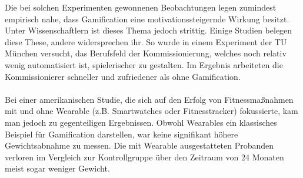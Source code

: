 Die bei solchen Experimenten gewonnenen Beobachtungen legen zumindest empirisch nahe, dass Gamification eine motivationssteigernde Wirkung besitzt. Unter Wissenschaftlern ist dieses Thema jedoch strittig. Einige Studien belegen diese These, andere widersprechen ihr. So wurde in einem Experiment der TU München versucht, das Berufsfeld der Kommissionierung, welches noch relativ wenig automatisiert ist, spielerischer zu gestalten. Im Ergebnis arbeiteten die Kommissionierer schneller und zufriedener als ohne Gamification. \cite{Src:WwieWissen} \\ \\
Bei einer amerikanischen Studie, die sich auf den Erfolg von Fitnessmaßnahmen mit und ohne Wearable (z.B. Smartwatches oder Fitnesstracker) fokussierte, kam man jedoch zu gegenteiligen Ergebnissen. Obwohl Wearables ein klassisches Beispiel für Gamification darstellen, war keine signifikant höhere Gewichtsabnahme zu messen. Die mit Wearable ausgestatteten Probanden verloren im Vergleich zur Kontrollgruppe über den Zeitraum von 24 Monaten meist sogar weniger Gewicht. \cite{Src:WearableMotiv}
